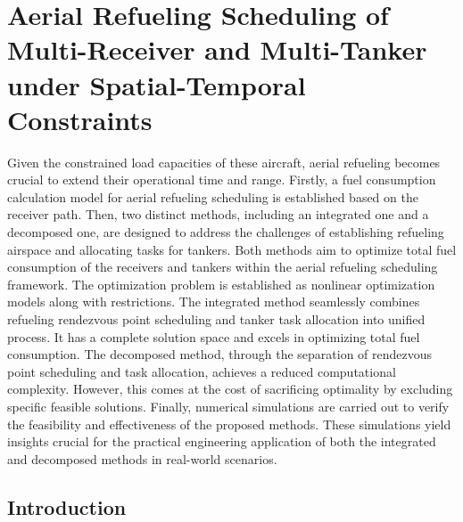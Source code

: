 
\chapter{Aerial Refueling Scheduling of Multi-Receiver and Multi-Tanker under Spatial-Temporal Constraints}

 Given the constrained load capacities of these aircraft, aerial refueling becomes crucial to extend their operational time and range. Firstly, a fuel consumption calculation model for aerial refueling scheduling is established based on the receiver path. Then, two distinct methods, including an integrated one and a decomposed one, are designed to address the challenges of establishing refueling airspace and allocating tasks for tankers. Both methods aim to optimize total fuel consumption of the receivers and tankers within the aerial refueling scheduling framework. The optimization problem is established as nonlinear optimization models along with restrictions. The integrated method seamlessly combines refueling rendezvous point scheduling and tanker task allocation into unified process. It has a complete solution space and excels in optimizing total fuel consumption. The decomposed method, through the separation of rendezvous point scheduling and task allocation, achieves a reduced computational complexity. However, this comes at the cost of sacrificing optimality by excluding specific feasible solutions. Finally, numerical simulations are carried out to verify the feasibility and effectiveness of the proposed methods. These simulations yield insights crucial for the practical engineering application of both the integrated and decomposed methods in real-world scenarios.

\section{Introduction}

